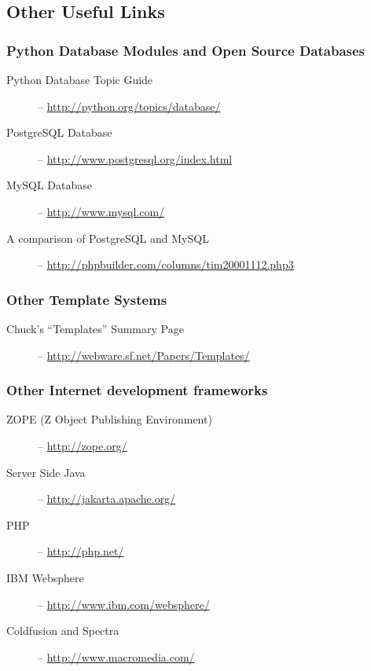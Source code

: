 \subsection{Other Useful Links}
\label{links.other}


\subsubsection{Python Database Modules and Open Source Databases}
\label{links.other}

\begin{description}
\item[Python Database Topic Guide] -- \url{http://python.org/topics/database/}
\item[PostgreSQL Database] -- \url{http://www.postgresql.org/index.html}
\item[MySQL Database] -- \url{http://www.mysql.com/}
\item[A comparison of PostgreSQL and MySQL] --
     \url{http://phpbuilder.com/columns/tim20001112.php3}
\end{description}

\subsubsection{Other Template Systems}
\label{links.other.templateSystems}

\begin{description}
\item[Chuck's ``Templates'' Summary Page] -- \url{http://webware.sf.net/Papers/Templates/}
\end{description}

\subsubsection{Other Internet development frameworks}
\label{links.other}

\begin{description}
\item[ZOPE (Z Object Publishing Environment)] -- \url{http://zope.org/}
\item[Server Side Java] -- \url{http://jakarta.apache.org/}
\item[PHP] -- \url{http://php.net/}
\item[IBM Websphere] -- \url{http://www.ibm.com/websphere/}
\item[Coldfusion and Spectra] -- \url{http://www.macromedia.com/}
\end{description}

